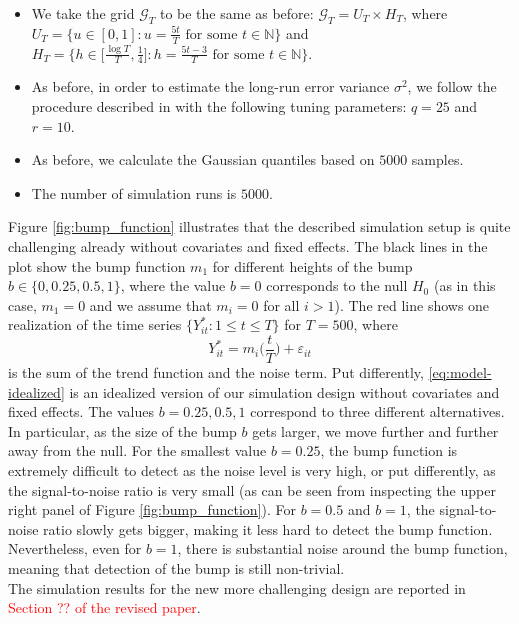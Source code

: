 \documentclass[a4paper,12pt]{article}
\begin{document}
\begin{enumerate}[label=\arabic*.,leftmargin=0.6cm]
\begin{enumerate}[label=(\roman*),leftmargin=0.75cm,topsep=0pt]
\begin{itemize}[leftmargin=0.45cm,itemsep=0pt,topsep=0pt]
\item We take the grid $\mathcal{G}_T$ to be the same as before: $\mathcal{G}_T = U_T \times H_T$, where $U_T = \big\{ u \in [0,1]: u = \textstyle{\frac{5t}{T}} \text{ for some } t \in \mathbb{N} \big\}$ and $H_T = \big\{ h \in \big[ \textstyle{\frac{\log T}{T}}, \textstyle{\frac{1}{4}} \big]:  h = \textstyle{\frac{5t - 3}{T}} \text{ for some } t \in \mathbb{N} \big\}$.

\item As before, in order to estimate the long-run error variance $\sigma^2$, we follow the procedure described in \citet{KhismatullinaVogt2020} with the following tuning parameters: $q = 25$ and $r = 10$.

\item As before, we calculate the Gaussian quantiles based on $5000$ samples. 

\item The number of simulation runs is $5000$. 

\end{itemize}

Figure \ref{fig:bump_function} illustrates that the described simulation setup is quite challenging already without covariates and fixed effects. The black lines in the plot show the bump function $m_1$ for different heights of the bump $b \in \{0, 0.25, 0.5, 1\}$, where the value $b=0$ corresponds to the null $H_0$ (as in this case, $m_1 = 0$ and we assume that $m_i = 0$ for all $i > 1$). The red line shows one realization of the time series $\{Y_{it}^*:1 \le t \le T \}$ for $T=500$, where 
\begin{equation}\label{eq:model-idealized}
Y_{it}^* = m_i\Big(\frac{t}{T}\Big) + \varepsilon_{it} 
\end{equation}
is the sum of the trend function and the noise term. Put differently, \eqref{eq:model-idealized} is an idealized version of our simulation design without covariates and fixed effects. The values $b=0.25,0.5,1$ correspond to three different alternatives. In particular, as the size of the bump $b$ gets larger, we move further and further away from the null. For the smallest value $b=0.25$, the bump function is extremely difficult to detect as the noise level is very high, or put differently, as the signal-to-noise ratio is very small (as can be seen from inspecting the upper right panel of Figure \ref{fig:bump_function}). For $b=0.5$ and $b=1$, the signal-to-noise ratio slowly gets bigger, making it less hard to detect the bump function. Nevertheless, even for $b=1$, there is substantial noise around the bump function, meaning that detection of the bump is still non-trivial. \\
The simulation results for the new more challenging design are reported in \textcolor{red}{Section ?? of the revised paper}. 


\end{enumerate}
\end{enumerate}
\end{document}
